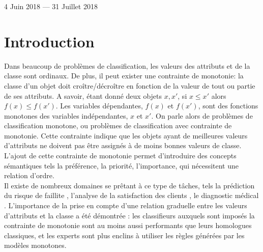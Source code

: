 \documentclass[a4paper]{article}
\begin{document}
\begin{titlepage}
\begin{center}
\begin{minipage}{0.5\textwidth}
\begin{flushright}
      \end{flushright}
    \end{minipage}

      \vspace{2cm}

    {\large 4 Juin 2018 — 31 Juillet 2018}

  \end{center}
\end{titlepage}

\newpage

\section{Introduction} Dans beaucoup de problèmes de classification, les valeurs
des attributs et de la classe sont ordinaux. De plus, il peut exister une
contrainte de monotonie: la classe d'un objet doit croître/décroître en fonction
de la valeur de tout ou partie de ses attributs.  A savoir, étant donné deux
objets $x, x'$, si $x \leq x'$ alors $f(x) \leq f(x')$. Les variables
dépendantes, $f(x)$ et $f(x')$, sont des fonctions monotones des variables
indépendantes, $x$ et $x'$.
On parle alors de problèmes de classification monotone, ou problèmes de
classification avec contrainte de monotonie. Cette contrainte indique que les
objets ayant de meilleures valeurs d'attributs ne doivent pas être assignés à de
moins bonnes valeurs de classe.\\
L'ajout de cette contrainte de monotonie permet d'introduire des concepts
sémantiques tels la préférence, la priorité, l'importance, qui nécessitent une
relation d'ordre.\\ Il existe de nombreux domaines se prêtant à ce type de
tâches, tels la prédiction du risque de faillite \cite{greco-new-bankruptcy},
l'analyse de la satisfaction des clients \cite{greco-customer}, le diagnostic
médical \cite{marsala-gradual}. 
L'importance de la prise en compte d'une relation graduelle entre les valeurs
d'attributs et la classe a été démontrée \cite{pazzani-acceptance}: les
classifieurs auxquels sont imposés la contrainte de monotonie sont au moins
aussi performants que leurs homologues classiques, et les experts sont plus
enclins à utiliser les règles générées par les modèles monotones.\\
\end{document}
